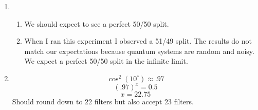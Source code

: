 \documentclass[12pt]{article}
\begin{document}
\begin{enumerate}[font=\bfseries]
\begin{enumerate}
    \end{enumerate}
    \item \begin{enumerate}
        \item We should expect to see a perfect 50/50 split.
        \item When I ran this experiment I observed a 51/49 split. The results do not match our expectations because quantum systems are random and noisy. We expect a perfect 50/50 split in the infinite limit.
    \end{enumerate}
    \item \[\cos^2({10^{\circ}}) \approx .97 \]
            \[(.97)^x = 0.5\]
            \[x = 22.75\]
            Should round down to 22 filters but also accept 23 filters.
\end{enumerate}
\end{document}
